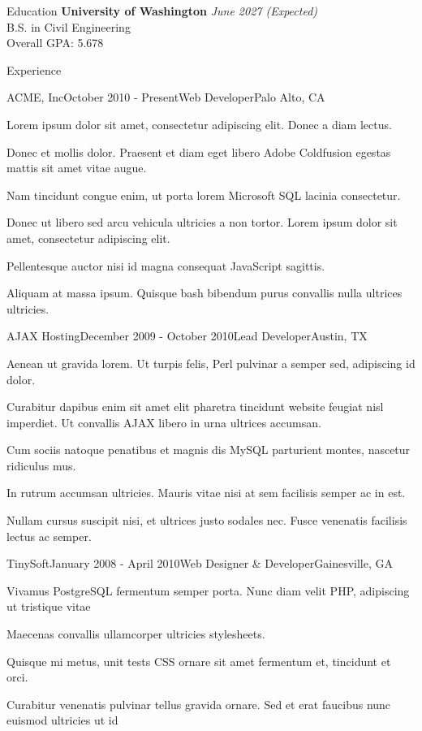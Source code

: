 \documentclass{resume}
\begin{document}
  \begin{rSection}{Education}
    {\bf University of Washington} \hfill {\em June 2027 (Expected)} \\ 
    { B.S. in Civil Engineering} \\
    Overall GPA: 5.678
  \end{rSection}
  
  \begin{rSection}{Experience}
  
    \begin{rSubsection}{ACME, Inc}{October 2010 - Present}{Web Developer}{Palo Alto, CA}
    \item Lorem ipsum dolor sit amet, consectetur adipiscing elit. Donec a diam lectus.
    \item Donec et mollis dolor. Praesent et diam eget libero Adobe Coldfusion egestas mattis sit amet vitae augue.
    \item Nam tincidunt congue enim, ut porta lorem Microsoft SQL lacinia consectetur.
    \item Donec ut libero sed arcu vehicula ultricies a non tortor. Lorem ipsum dolor sit amet, consectetur adipiscing elit.
    \item Pellentesque auctor nisi id magna consequat JavaScript sagittis.
    \item Aliquam at massa ipsum. Quisque bash bibendum purus convallis nulla ultrices ultricies.
    \end{rSubsection}
  
    \begin{rSubsection}{AJAX Hosting}{December 2009 - October 2010}{Lead Developer}{Austin, TX}
    \item Aenean ut gravida lorem. Ut turpis felis, Perl pulvinar a semper sed, adipiscing id dolor.
    \item Curabitur dapibus enim sit amet elit pharetra tincidunt website feugiat nisl imperdiet. Ut convallis AJAX libero in urna ultrices accumsan.
    \item Cum sociis natoque penatibus et magnis dis MySQL parturient montes, nascetur ridiculus mus.
    \item In rutrum accumsan ultricies. Mauris vitae nisi at sem facilisis semper ac in est.
    \item Nullam cursus suscipit nisi, et ultrices justo sodales nec. Fusce venenatis facilisis lectus ac semper.
    \end{rSubsection}

    \begin{rSubsection}{TinySoft}{January 2008 - April 2010}{Web Designer \& Developer}{Gainesville, GA}
    \item Vivamus PostgreSQL fermentum semper porta. Nunc diam velit PHP, adipiscing ut tristique vitae
    \item Maecenas convallis ullamcorper ultricies stylesheets.
    \item Quisque mi metus, unit tests CSS ornare sit amet fermentum et, tincidunt et orci.
    \item Curabitur venenatis pulvinar tellus gravida ornare. Sed et erat faucibus nunc euismod ultricies ut id
    \end{rSubsection}
  

\end{rSection}
\end{document}
